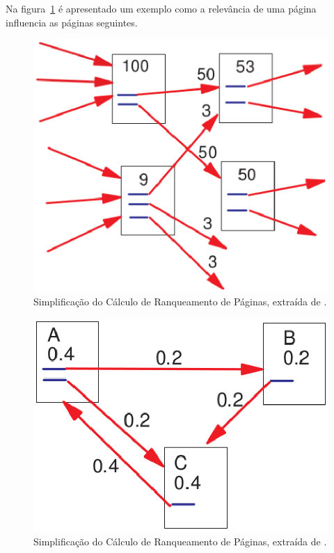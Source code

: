 Na figura~\ref{fig:page_rank} é apresentado um exemplo como a relevância de uma página influencia as páginas seguintes.

\begin{figure}[!h]
    \centering
        \includegraphics[keepaspectratio=true,scale=0.5]{figuras/page_rank.eps}
    \caption{Simplificação do Cálculo de Ranqueamento de Páginas, extraída de \cite{pageRank}.}
    \label{fig:page_rank}
\end{figure}

\begin{figure}[!h]
    \centering
        \includegraphics[keepaspectratio=true,scale=0.5]{figuras/page_rank2.eps}
    \caption{Simplificação do Cálculo de Ranqueamento de Páginas, extraída de \cite{pageRank}.}
    \label{fig:page_rank2}
\end{figure}

